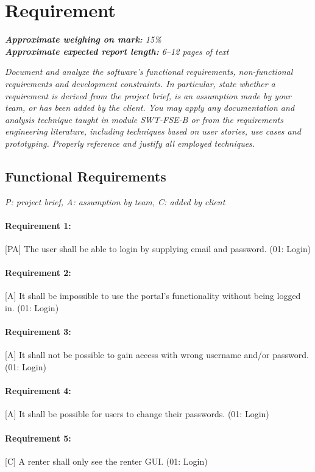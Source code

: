 \section{Requirement}
\label{sec:requirements}

\emph{\textbf{Approximate weighing on mark:} 15\%}							\\
\emph{\textbf{Approximate expected report length:} 6--12 pages of text}

\emph{Document and analyze the software's functional requirements, 
non-functional requirements and development constraints. In particular, state 
whether a requirement is derived from the project brief, is an assumption made 
by your team, or has been added by the client. You may apply any documentation 
and analysis technique taught in module SWT-FSE-B or from the requirements 
engineering literature, including techniques based on user stories, use cases 
and prototyping. Properly reference and justify all employed techniques.}

\subsection{Functional Requirements}
\emph{P: project brief, A: assumption by team, C: added by client}

\paragraph{Requirement 1:} [PA] The user shall be able to login by supplying email and password. (01: Login)
\paragraph{Requirement 2:} [A] It shall be impossible to use the portal's functionality without being logged in. (01: Login)
\paragraph{Requirement 3:} [A] It shall not be possible to gain access with wrong username and/or password. (01: Login)
\paragraph{Requirement 4:} [A] It shall be possible for users to change their passwords. (01: Login)
\paragraph{Requirement 5:} [C] A renter shall only see the renter GUI. (01: Login)
